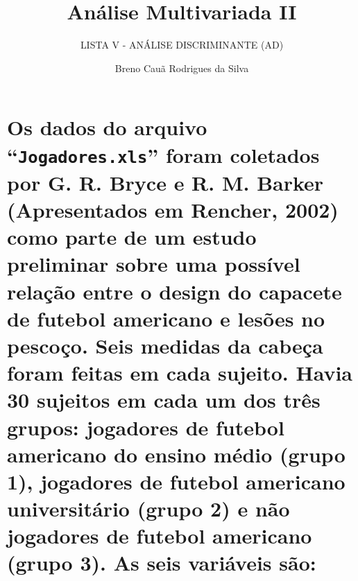 \documentclass[
  portuguese,
  11pt,
]{article}
\title{Análise Multivariada II}
\subtitle{LISTA V - ANÁLISE DISCRIMINANTE (AD)}
\author{Breno Cauã Rodrigues da Silva}
\date{}
\begin{document}
\maketitle


\section*{\texorpdfstring{Os dados do arquivo ``\texttt{Jogadores.xls}''
foram coletados por G. R. Bryce e R. M. Barker (Apresentados em Rencher,
2002) como parte de um estudo preliminar sobre uma possível relação
entre o design do capacete de futebol americano e lesões no pescoço.
Seis medidas da cabeça foram feitas em cada sujeito. Havia 30 sujeitos
em cada um dos três grupos: jogadores de futebol americano do ensino
médio (grupo 1), jogadores de futebol americano universitário (grupo 2)
e não jogadores de futebol americano (grupo 3). As seis variáveis
são:}{Os dados do arquivo ``Jogadores.xls'' foram coletados por G. R. Bryce e R. M. Barker (Apresentados em Rencher, 2002) como parte de um estudo preliminar sobre uma possível relação entre o design do capacete de futebol americano e lesões no pescoço. Seis medidas da cabeça foram feitas em cada sujeito. Havia 30 sujeitos em cada um dos três grupos: jogadores de futebol americano do ensino médio (grupo 1), jogadores de futebol americano universitário (grupo 2) e não jogadores de futebol americano (grupo 3). As seis variáveis são:}}\label{os-dados-do-arquivo-jogadores.xls-foram-coletados-por-g.-r.-bryce-e-r.-m.-barker-apresentados-em-rencher-2002-como-parte-de-um-estudo-preliminar-sobre-uma-possuxedvel-relauxe7uxe3o-entre-o-design-do-capacete-de-futebol-americano-e-lesuxf5es-no-pescouxe7o.-seis-medidas-da-cabeuxe7a-foram-feitas-em-cada-sujeito.-havia-30-sujeitos-em-cada-um-dos-truxeas-grupos-jogadores-de-futebol-americano-do-ensino-muxe9dio-grupo-1-jogadores-de-futebol-americano-universituxe1rio-grupo-2-e-nuxe3o-jogadores-de-futebol-americano-grupo-3.-as-seis-variuxe1veis-suxe3o}
\end{document}
